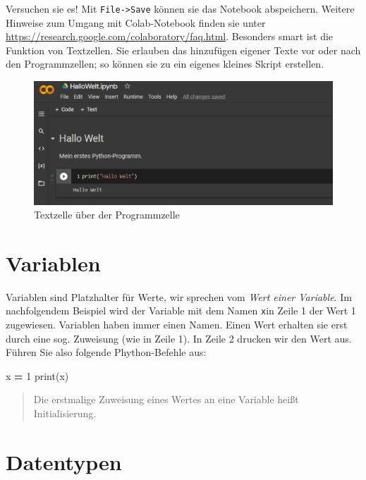 \documentclass[
  oneside]{book}
\newenvironment{Shaded}{\begin{snugshade}}{\end{snugshade}}
\newcommand{\BuiltInTok}[1]{#1}
\newcommand{\DecValTok}[1]{\textcolor[rgb]{0.00,0.00,0.81}{#1}}
\newcommand{\NormalTok}[1]{#1}
\newcommand{\OperatorTok}[1]{\textcolor[rgb]{0.81,0.36,0.00}{\textbf{#1}}}
\begin{document}
Versuchen sie es! Mit \texttt{File-\textgreater{}Save} können sie das Notebook abspeichern. Weitere Hinweise zum Umgang mit Colab-Notebook finden sie unter \url{https://research.google.com/colaboratory/faq.html}. Besonders smart ist die Funktion von Textzellen. Sie erlauben das hinzufügen eigener Texte vor oder nach den Programmzellen; so können sie zu ein eigenes kleines Skript erstellen.

\begin{figure}
\centering
\includegraphics[width=1\textwidth,height=\textheight]{01-python.assets/image-20220220190605212.png}
\caption{Textzelle über der Programmzelle}
\end{figure}

\hypertarget{variablen}{%
\section{Variablen}\label{variablen}}

Variablen sind Platzhalter für Werte, wir sprechen vom \emph{Wert einer Variable}. Im nachfolgendem Beispiel wird der Variable mit dem Namen \texttt{x}in Zeile 1 der Wert 1 zugewiesen. Variablen haben immer einen Namen. Einen Wert erhalten sie erst durch eine sog. Zuweisung (wie in Zeile 1). In Zeile 2 drucken wir den Wert aus. Führen Sie also folgende Phython-Befehle aus:

\begin{Shaded}
\begin{Highlighting}[]
\NormalTok{x }\OperatorTok{=} \DecValTok{1}
\BuiltInTok{print}\NormalTok{(x)}
\end{Highlighting}
\end{Shaded}

\begin{quote}
Die erstmalige Zuweisung eines Wertes an eine Variable heißt Initialisierung.
\end{quote}

\hypertarget{datentypen}{%
\section{Datentypen}\label{datentypen}}
\end{document}
